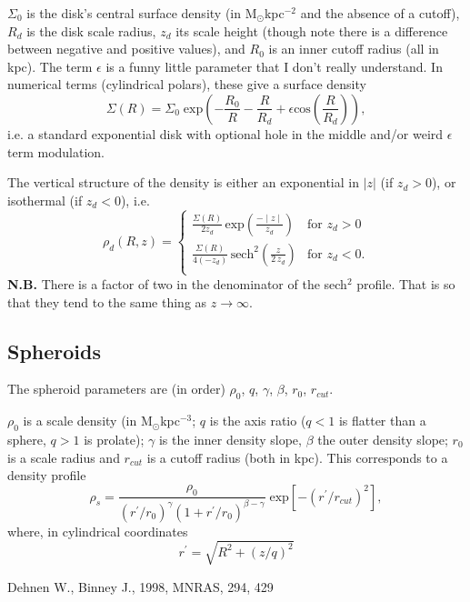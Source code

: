 \documentclass{article}
\begin{document}
$\Sigma_0$ is the disk's central surface density (in M$_\odot$kpc$^{-2}$
and the absence of a cutoff), $R_d$ is the disk
scale radius, $z_d$ its scale height (though note there is a
difference between negative and positive values), and $R_0$ is an inner
cutoff radius (all in kpc). The term $\epsilon$ is a funny little parameter that I don't
really understand. In numerical terms (cylindrical polars), these
give a surface density
\begin{equation}
\Sigma(R)=\Sigma_0\;\textrm{exp}\left(-\frac{R_0}{R}-\frac{R}{R_d}+
  \epsilon\textrm{cos}\left(\frac{R}{R_d}\right)\right),
\end{equation}
i.e. a standard exponential disk with optional hole in the middle and/or
weird $\epsilon$ term modulation.

The vertical structure of the density is either an exponential in
$|z|$ (if $z_d>0$), or isothermal (if $z_d<0$), i.e.
\begin{equation}
\rho_d(R,z)=\left\{\begin{array}{lc}\frac{\Sigma(R)}{2z_d}\,\textrm{exp}\left(\frac{-\mid
        z\mid}{z_d}\right) & \textrm{for }z_d > 0 \\
\frac{\Sigma(R)}{4(-z_d)}\,\textrm{sech}^2\left(\frac{z}{2\,z_d}\right)
& \textrm{for } z_d
< 0.\\\end{array}\right. 
\end{equation}
{\bf N.B.} There is a factor of two in the denominator of the sech$^2$
profile. That is so that they tend to the same thing as
$z\rightarrow\infty$.

\subsection{Spheroids}

The spheroid parameters are (in order) $\rho_0$, $q$, $\gamma$,
$\beta$, $r_0$, $r_{cut}$.

$\rho_0$ is a scale density (in M$_\odot$kpc$^{-3}$; $q$ is the axis ratio ($q<1$ is flatter
than a sphere, $q>1$ is prolate); $\gamma$ is the inner density slope,
$\beta$ the outer density slope; $r_0$ is a scale radius and $r_{cut}$
is a cutoff radius (both in kpc). This corresponds to a density profile
\begin{equation}
\rho_s=\frac{\rho_0}{(r^\prime/r_0)^\gamma(1+r^\prime/r_0)^{\beta-\gamma}}\; 
\textrm{exp}\left[-\left(r^\prime/r_{cut}\right)^2\right],
\end{equation}
where, in cylindrical coordinates
\begin{equation}
r^\prime = \sqrt{R^2 + (z/q)^2}
\end{equation}



\begin{thebibliography}{36}
 

{Dehnen} W., {Binney} J., 1998, MNRAS, 294, 429
 
\end{thebibliography}
 
\end{document}

